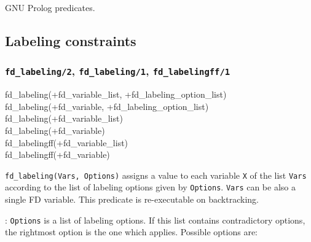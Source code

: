 \Portability

GNU Prolog predicates.

\subsection{Labeling constraints}

\subsubsection{\texttt{fd\_labeling/2},
               \texttt{fd\_labeling/1},
               \texttt{fd\_labelingff/1}}
\label{fd-labeling/2}

\begin{TemplatesOneCol}
fd\_labeling(+fd\_variable\_list, +fd\_labeling\_option\_list)\\
fd\_labeling(+fd\_variable, +fd\_labeling\_option\_list)\\
fd\_labeling(+fd\_variable\_list)\\
fd\_labeling(+fd\_variable)\\
fd\_labelingff(+fd\_variable\_list)\\
fd\_labelingff(+fd\_variable)

\end{TemplatesOneCol}

\Description

\texttt{fd\_labeling(Vars, Options)} assigns a value to each variable
\texttt{X} of the list \texttt{Vars} according to the list of labeling
options given by \texttt{Options}. \texttt{Vars} can be also a single FD
variable. This predicate is re-executable on backtracking.

: \texttt{Options} is a list of labeling
options. If this list contains contradictory options, the rightmost option
is the one which applies. Possible options are:


